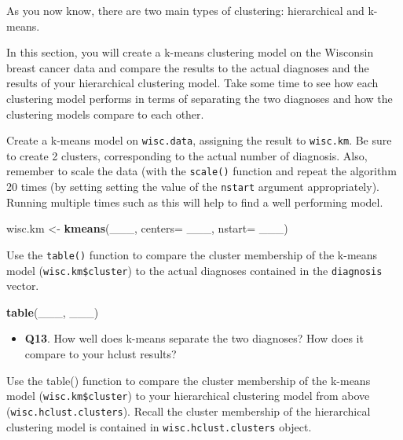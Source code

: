 \documentclass[]{article}
\newenvironment{Shaded}{\begin{snugshade}}{\end{snugshade}}
\newcommand{\KeywordTok}[1]{\textcolor[rgb]{0.13,0.29,0.53}{\textbf{#1}}}
\newcommand{\DataTypeTok}[1]{\textcolor[rgb]{0.13,0.29,0.53}{#1}}
\newcommand{\StringTok}[1]{\textcolor[rgb]{0.31,0.60,0.02}{#1}}
\newcommand{\NormalTok}[1]{#1}
\providecommand{\tightlist}{%
  \setlength{\itemsep}{0pt}\setlength{\parskip}{0pt}}
\begin{document}
As you now know, there are two main types of clustering: hierarchical
and k-means.

In this section, you will create a k-means clustering model on the
Wisconsin breast cancer data and compare the results to the actual
diagnoses and the results of your hierarchical clustering model. Take
some time to see how each clustering model performs in terms of
separating the two diagnoses and how the clustering models compare to
each other.

Create a k-means model on \texttt{wisc.data}, assigning the result to
\texttt{wisc.km}. Be sure to create 2 clusters, corresponding to the
actual number of diagnosis. Also, remember to scale the data (with the
\texttt{scale()} function and repeat the algorithm 20 times (by setting
setting the value of the \texttt{nstart} argument appropriately).
Running multiple times such as this will help to find a well performing
model.

\begin{Shaded}
\begin{Highlighting}[]
\NormalTok{wisc.km <-}\StringTok{ }\KeywordTok{kmeans}\NormalTok{(___, }\DataTypeTok{centers=}\NormalTok{ ___, }\DataTypeTok{nstart=}\NormalTok{ ___)}
\end{Highlighting}
\end{Shaded}

Use the \texttt{table()} function to compare the cluster membership of
the k-means model (\texttt{wisc.km\$cluster}) to the actual diagnoses
contained in the \texttt{diagnosis} vector.

\begin{Shaded}
\begin{Highlighting}[]
\KeywordTok{table}\NormalTok{(___, ___)}
\end{Highlighting}
\end{Shaded}

\begin{itemize}
\tightlist
\item
  \textbf{Q13}. How well does k-means separate the two diagnoses? How
  does it compare to your hclust results?
\end{itemize}

Use the table() function to compare the cluster membership of the
k-means model (\texttt{wisc.km\$cluster}) to your hierarchical
clustering model from above (\texttt{wisc.hclust.clusters}). Recall the
cluster membership of the hierarchical clustering model is contained in
\texttt{wisc.hclust.clusters} object.
\end{document}
